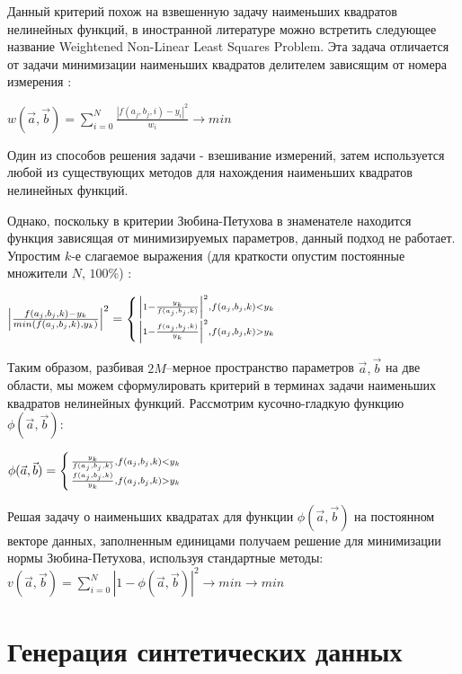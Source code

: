 Данный критерий похож на взвешенную задачу наименьших квадратов 
нелинейных функций, в иностранной литературе можно встретить следующее название 
Weightened Non-Linear Least Squares Problem. Эта задача отличается
от задачи минимизации наименьших квадратов делителем зависящим от номера измерения : 
\begin{center}
$w(\vec{a}, \vec{b}) = \displaystyle\sum_{i=0}^N \frac{\left|f(a_j, b_j, i) - y_i\right|^2}{w_i} \rightarrow min$
\end{center}
Один из способов решения задачи - взешивание измерений, затем 
используется любой из существующих методов для нахождения 
наименьших квадратов нелинейных функций.


Однако, поскольку в критерии Зюбина-Петухова в знаменателе 
находится функция зависящая от минимизируемых параметров, 
данный подход не работает. Упростим $k$-е слагаемое выражения %
(для краткости опустим постоянные множители $N$, $100\%$) : 

\begin{center}
 \LARGE{$ \left|\frac{f(a_j, b_j, k) - y_k}{min(f(a_j, b_j, k), y_k)}\right|^2 = \left\{ {
    \left| 1 - \frac{y_k}{f(a_j, b_j, k)}\right|^2 , f(a_j, b_j, k) < y_k  \atop 
    \left| 1 - \frac{f(a_j, b_j, k)}{y_k}\right|^2 , f(a_j, b_j, k) > y_k  
 } \right. $}
\end{center}

Таким образом, разбивая $ 2 M $--мерное пространство параметров $ \vec{a}, \vec{b}$ на две области, мы можем сформулировать критерий в терминах задачи наименьших квадратов нелинейных функций.
Рассмотрим кусочно-гладкую функцию $\phi(\vec{a}, \vec{b})$: 
\begin{center}
$ \phi(\vec{a}, \vec{b}) = \left\{ {
    \frac{y_k}{f(a_j, b_j, k)} , f(a_j, b_j, k) < y_k  \atop 
    \frac{f(a_j, b_j, k)}{y_k} , f(a_j, b_j, k) > y_k  
 } \right.$
\end{center}

Решая задачу о наименьших квадратах для функции 
$\phi(\vec{a}, \vec{b})$ на постоянном векторе данных, заполненным
единицами получаем решение для минимизации нормы 
Зюбина-Петухова, используя стандартные методы: 
$v(\vec{a}, \vec{b}) = \displaystyle\sum_{i=0}^N \left|1 -
\phi(\vec{a}, \vec{b})\right|^2 \rightarrow min \rightarrow min$


\section{Генерация синтетических данных}\label{sect2_3}


